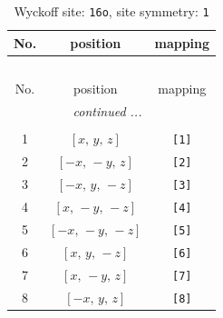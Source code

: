 \documentclass[fleqn,8pt]{jsarticle}
\begin{document}
\renewcommand{\arraystretch}{1.2}
\begin{longtable}{ccc}
\caption{Wyckoff site: {\tt 16o}, site symmetry: {\tt 1}}
 \\
 \hline \hline
No. & position & mapping \\ \hline \endfirsthead

\multicolumn{2}{l}{\tablename\ \thetable{}} \\
 \hline \hline
No. & position & mapping \\ \hline \endhead

 \hline \hline
\multicolumn{2}{r}{\footnotesize\it continued ...} \\ \endfoot

 \hline \hline
\multicolumn{2}{r}{} \\ \endlastfoot

1 & $\left[ x,\, y,\, z \right]$ & {\tt [1]} \\ \hline
2 & $\left[ - x,\, - y,\, z \right]$ & {\tt [2]} \\ \hline
3 & $\left[ - x,\, y,\, - z \right]$ & {\tt [3]} \\ \hline
4 & $\left[ x,\, - y,\, - z \right]$ & {\tt [4]} \\ \hline
5 & $\left[ - x,\, - y,\, - z \right]$ & {\tt [5]} \\ \hline
6 & $\left[ x,\, y,\, - z \right]$ & {\tt [6]} \\ \hline
7 & $\left[ x,\, - y,\, z \right]$ & {\tt [7]} \\ \hline
8 & $\left[ - x,\, y,\, z \right]$ & {\tt [8]} \\
\end{longtable}
\end{document}
